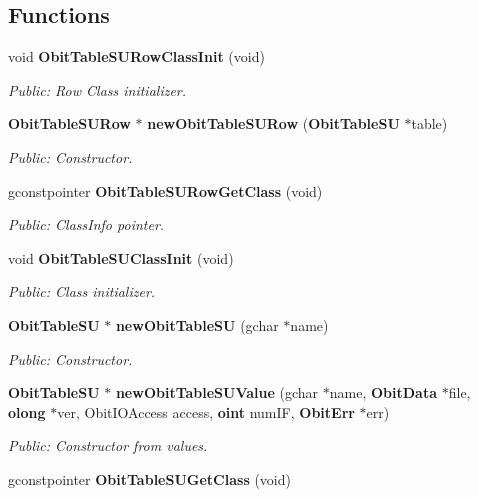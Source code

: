\subsection*{Functions}
\begin{CompactItemize}
\item 
void {\bf Obit\-Table\-SURow\-Class\-Init} (void)
\begin{CompactList}\small\item\em Public: Row Class initializer. \item\end{CompactList}\item 
{\bf Obit\-Table\-SURow} $\ast$ {\bf new\-Obit\-Table\-SURow} ({\bf Obit\-Table\-SU} $\ast$table)
\begin{CompactList}\small\item\em Public: Constructor. \item\end{CompactList}\item 
gconstpointer {\bf Obit\-Table\-SURow\-Get\-Class} (void)
\begin{CompactList}\small\item\em Public: Class\-Info pointer. \item\end{CompactList}\item 
void {\bf Obit\-Table\-SUClass\-Init} (void)
\begin{CompactList}\small\item\em Public: Class initializer. \item\end{CompactList}\item 
{\bf Obit\-Table\-SU} $\ast$ {\bf new\-Obit\-Table\-SU} (gchar $\ast$name)
\begin{CompactList}\small\item\em Public: Constructor. \item\end{CompactList}\item 
{\bf Obit\-Table\-SU} $\ast$ {\bf new\-Obit\-Table\-SUValue} (gchar $\ast$name, {\bf Obit\-Data} $\ast$file, {\bf olong} $\ast$ver, Obit\-IOAccess access, {\bf oint} num\-IF, {\bf Obit\-Err} $\ast$err)
\begin{CompactList}\small\item\em Public: Constructor from values. \item\end{CompactList}\item 
gconstpointer {\bf Obit\-Table\-SUGet\-Class} (void)

\end{CompactItemize}
